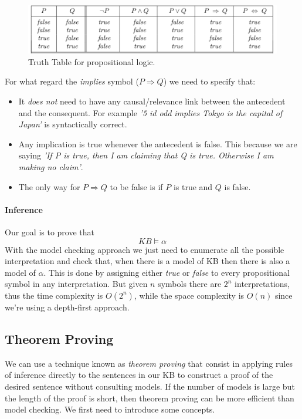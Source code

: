 \documentclass[10pt,a4paper]{article}
\begin{document}
\begin{figure}[H]
\includegraphics[scale=0.7]{images/truth_table.png}
\caption{Truth Table for propositional logic.}
\label{fig:truth_table}
\end{figure}

For  what regard the \textit{implies} symbol ($P \Rightarrow Q$) we need to specify that:
\begin{itemize}
\item It \textit{does not} need to have any causal/relevance link between the antecedent and the consequent. For example \textit{'5 id odd implies Tokyo is the capital of Japan'} is syntactically correct.
\item Any implication is true whenever the antecedent is false. This because we are saying \textit{'If P is true, then I am claiming that Q is true. Otherwise I am making no claim'}.
\item The only way for $P \Rightarrow Q$ to be false is if $P$ is true and $Q$ is false.
\end{itemize}


\paragraph{Inference}
Our goal is to prove that
\[KB \models \alpha\]
With the model checking approach we just need to enumerate all the possible interpretation and check that, when there is a model of KB then there is also a model of $\alpha$. This is done by assigning either \textit{true} or \textit{false} to every propositional symbol in any interpretation. But given $n$ symbols there are $2^n$ interpretations, thus the time complexity is $O(2^n)$, while the space complexity is $O(n)$ since we're using a depth-first approach. 

\subsection{Theorem Proving}
We can use a technique known as \textit{theorem proving} that consist in applying rules of inference directly to the sentences in our KB to construct a proof of the desired sentence without consulting models. If the number of models is large but the length of the proof is short, then theorem proving can be more efficient than model checking. We first need to introduce some concepts.
\end{document}
